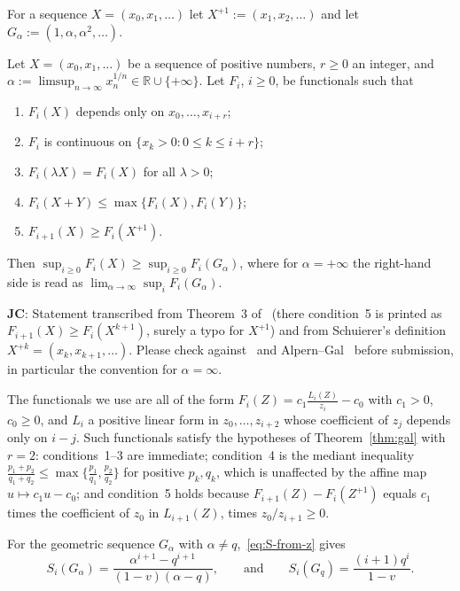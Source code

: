 \documentclass[runningheads,envcountsame,envcountsect]{llncs}
\newcommand\JC[1]{{\color{Maroon} \textbf{JC}: #1}}
\begin{document}
For a sequence $X = (x_0, x_1, \ldots)$ let $X^{+1} := (x_1, x_2, \ldots)$ and let $G_\alpha := (1, \alpha, \alpha^2, \ldots)$.

\begin{theorem}\label{thm:gal}
Let $X = (x_0, x_1, \ldots)$ be a sequence of positive numbers, $r \geq 0$ an integer, and $\alpha := \limsup_{n \to \infty} x_n^{1/n} \in \mathbb{R} \cup \{+\infty\}$. Let $F_i$, $i \geq 0$, be functionals such that
\begin{enumerate}
  \item $F_i(X)$ depends only on $x_0, \ldots, x_{i+r}$;
  \item $F_i$ is continuous on $\{x_k > 0 : 0 \leq k \leq i + r\}$;
  \item $F_i(\lambda X) = F_i(X)$ for all $\lambda > 0$;
  \item $F_i(X + Y) \leq \max\{F_i(X), F_i(Y)\}$;
  \item $F_{i+1}(X) \geq F_i(X^{+1})$.
\end{enumerate}
Then $\sup_{i \geq 0} F_i(X) \geq \sup_{i \geq 0} F_i(G_\alpha)$, where for $\alpha = +\infty$ the right-hand side is read as $\lim_{\alpha \to \infty} \sup_i F_i(G_\alpha)$.
\end{theorem}

\JC{Statement transcribed from Theorem~3 of~\cite{angelopoulos2019bestoftwo} (there condition~5 is printed as $F_{i+1}(X) \geq F_i(X^{k+1})$, surely a typo for $X^{+1}$) and from Schuierer's definition $X^{+k} = (x_k, x_{k+1}, \ldots)$. Please check against~\cite{schuierer2001lower} and Alpern--Gal~\cite{alpern2003theory} before submission, in particular the convention for $\alpha = \infty$.}

The functionals we use are all of the form $F_i(Z) = c_1 \frac{L_i(Z)}{z_i} - c_0$ with $c_1 > 0$, $c_0 \geq 0$, and $L_i$ a positive linear form in $z_0, \ldots, z_{i+2}$ whose coefficient of $z_j$ depends only on $i - j$. Such functionals satisfy the hypotheses of Theorem~\ref{thm:gal} with $r = 2$: conditions~1--3 are immediate; condition~4 is the mediant inequality $\frac{p_1 + p_2}{q_1 + q_2} \leq \max\{\frac{p_1}{q_1}, \frac{p_2}{q_2}\}$ for positive $p_k, q_k$, which is unaffected by the affine map $u \mapsto c_1 u - c_0$; and condition~5 holds because $F_{i+1}(Z) - F_i(Z^{+1})$ equals $c_1$ times the coefficient of $z_0$ in $L_{i+1}(Z)$, times $z_0 / z_{i+1} \geq 0$.

For the geometric sequence $G_\alpha$ with $\alpha \neq q$,~\eqref{eq:S-from-z} gives
\begin{equation}\label{eq:S-geo}
  S_i(G_\alpha) = \frac{\alpha^{i+1} - q^{i+1}}{(1-v)(\alpha - q)}, \qquad\text{and}\qquad S_i(G_q) = \frac{(i+1) q^i}{1-v}.
\end{equation}
\end{document}
